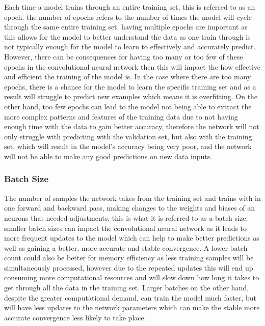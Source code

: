 \documentclass[]{final_report}
\begin{document}
Each time a model trains through an entire training set, this is referred to as an epoch. the number of epochs refers to the number of times the model will cycle through the same entire training set. having multiple epochs are important as this allows for the model to better understand the data as one train through is not typically enough for the model to learn to effectively and accurately predict. However, there can be consequences for having too many or too few of these epochs in the convolutional neural network then this will impact the how effective and efficient the training of the model is. In the case where there are too many epochs, there is a chance for the model to learn the specific training set and as a result will struggle to predict new examples which means it is overfitting. On the other hand, too few epochs can lead to the model not being able to extract the more complex patterns and features of the training data due to not having enough time with the data to gain better accuracy, therefore the network will not only struggle with predicting with the validation set, but also with the training set, which will result in the model’s accuracy being very poor, and the network will not be able to make any good predictions on new data inputs.\cite{MachineLearningMastery2025}

\subsubsection{Batch Size}

The number of samples the network takes from the training set and trains with in one forward and backward pass, making changes to the weights and biases of an neurons that needed adjustments, this is what it is referred to as a batch size. smaller batch sizes can impact the convolutional neural network as it leads to more frequent updates to the model which can help to make better predictions as well as gaining a better, more accurate and stable convergence. A lower batch count could also be better for memory efficiency as less training samples will be simultaneously processed, however due to the repeated updates this will end up consuming more computational resources and will slow down how long it takes to get through all the data in the training set. Larger batches on the other hand, despite the greater computational demand, can train the model much faster, but will have less updates to the network parameters which can make the stable more accurate convergence less likely to take place.\cite{MachineLearningMastery2025}
\end{document}
